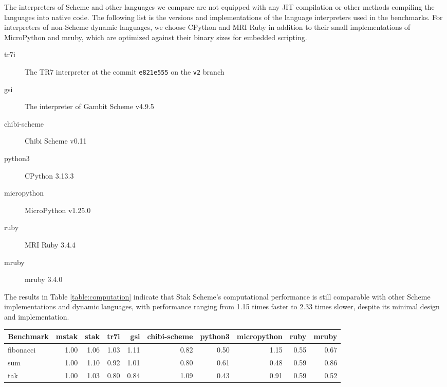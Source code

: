 \documentclass[sigplan, anonymous, review]{acmart}
\begin{document}
The interpreters of Scheme and other languages we compare are not
equipped with
any JIT compilation or other methods compiling the languages into
native code.
The following list is the versions and implementations of
the language interpreters used in the benchmarks.
For interpreters of non-Scheme dynamic languages, we choose CPython and
MRI Ruby in addition to their small implementations of MicroPython
and mruby, which are optimized against their binary sizes for
embedded scripting.

\begin{description}
  \item[tr7i] The TR7 interpreter at the commit \texttt{e821e555}
    on the \texttt{v2} branch
  \item[gsi] The interpreter of Gambit Scheme v4.9.5
  \item[chibi-scheme] Chibi Scheme v0.11
  \item[python3] CPython 3.13.3
  \item[micropython] MicroPython v1.25.0
  \item[ruby] MRI Ruby 3.4.4
  \item[mruby] mruby 3.4.0
\end{description}

The results in Table \ref{table:computation} indicate that Stak
Scheme's computational performance is still comparable with other
Scheme implementations and dynamic languages, with performance
ranging from 1.15 times faster to 2.33 times slower,
despite its minimal design and implementation.

\begin{table*}
  \begin{center}
    \caption{Computational benchmarks (relative time. lower is better.)}
    \label{table:computation}
    \begin{tabular}{l|rrrrrrrrr}
      \hline
      Benchmark & mstak & stak & tr7i & gsi & chibi-scheme & python3
      & micropython & ruby & mruby \\
      \hline
      fibonacci & 1.00 & 1.06 & 1.03 & 1.11 & 0.82 & 0.50 & 1.15 &
      0.55 & 0.67 \\
      sum & 1.00 & 1.10 & 0.92 & 1.01 & 0.80 & 0.61 & 0.48 & 0.59 & 0.86 \\
      tak & 1.00 & 1.03 & 0.80 & 0.84 & 1.09 & 0.43 & 0.91 & 0.59 & 0.52 \\
      \hline
    \end{tabular}
  \end{center}
\end{table*}
\end{document}
